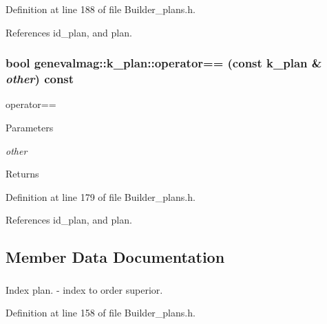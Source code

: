 Definition at line 188 of file Builder\_\-plans.h.



References id\_\-plan, and plan.

\hypertarget{structgenevalmag_1_1k__plan_a1ebe5a12c410624fec9631ff2e522767}{
\subsubsection[{operator==}]{\setlength{\rightskip}{0pt plus 5cm}bool genevalmag::k\_\-plan::operator== (const {\bf k\_\-plan} \& {\em other}) const}}
\label{structgenevalmag_1_1k__plan_a1ebe5a12c410624fec9631ff2e522767}
operator== 
\begin{DoxyParams}{Parameters}
\item[{\em other}]\end{DoxyParams}
\begin{DoxyReturn}{Returns}

\end{DoxyReturn}


Definition at line 179 of file Builder\_\-plans.h.



References id\_\-plan, and plan.



\subsection{Member Data Documentation}
\hypertarget{structgenevalmag_1_1k__plan_a477573001560bced8ad15aa7a5013ac0}{
\subsubsection[{id\_\-plan}]{}}
\label{structgenevalmag_1_1k__plan_a477573001560bced8ad15aa7a5013ac0}


Index plan. -\/ index to order superior. 



Definition at line 158 of file Builder\_\-plans.h.



